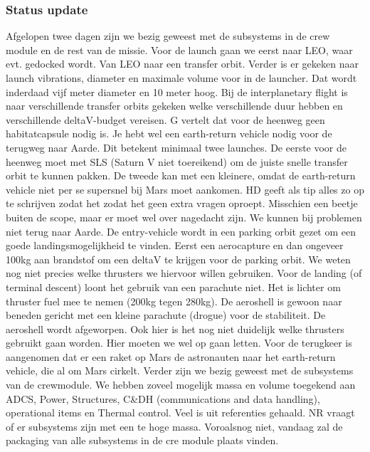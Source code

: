 \subsubsection{Status update}
Afgelopen twee dagen zijn we bezig geweest met de subsystems in de crew module en de rest van de missie.
\newline
Voor de launch gaan we eerst naar LEO, waar evt. gedocked wordt. Van LEO naar een transfer orbit. Verder is er gekeken naar launch vibrations, diameter en maximale volume voor in de launcher. Dat wordt inderdaad vijf meter diameter en 10 meter hoog.
\newline
Bij de interplanetary flight is naar verschillende transfer orbits gekeken welke verschillende duur hebben en verschillende deltaV-budget vereisen.
\newline
G vertelt dat voor de heenweg geen habitatcapsule nodig is. Je hebt wel een earth-return vehicle nodig voor de terugweg naar Aarde. Dit betekent minimaal twee launches. De eerste voor de heenweg moet met SLS (Saturn V niet toereikend) om de juiste snelle transfer orbit te kunnen pakken. De tweede kan met een kleinere, omdat de earth-return vehicle niet per se supersnel bij Mars moet aankomen. HD geeft als tip alles zo op te schrijven zodat het zodat het geen extra vragen oproept. Misschien een beetje buiten de scope, maar er moet wel over nagedacht zijn.
\newline
We kunnen bij problemen niet terug naar Aarde. De entry-vehicle wordt in een parking orbit gezet om een goede landingsmogelijkheid te vinden. Eerst een aerocapture en dan ongeveer 100kg aan brandstof om een deltaV te krijgen voor de parking orbit. We weten nog niet precies welke thrusters we hiervoor willen gebruiken.
\newline
Voor de landing (of terminal descent) loont het gebruik van een parachute niet. Het is lichter om thruster fuel mee te nemen (200kg tegen 280kg). De aeroshell is gewoon naar beneden gericht met een kleine parachute (drogue) voor de stabiliteit. De aeroshell wordt afgeworpen. Ook hier is het nog niet duidelijk welke thrusters gebruikt gaan worden. Hier moeten we wel op gaan letten.
\newline
Voor de terugkeer is aangenomen dat er een raket op Mars de astronauten naar het earth-return vehicle, die al om Mars cirkelt.
\newline\newline
Verder zijn we bezig geweest met de subsystems van de crewmodule. We hebben zoveel mogelijk massa en volume toegekend aan ADCS, Power, Structures, C\&DH (communications and data handling), operational items en Thermal control. Veel is uit referenties gehaald. NR vraagt of er subsystems zijn met een te hoge massa. Voroalsnog niet, vandaag zal de packaging van alle subsystems in de cre module plaats vinden.
